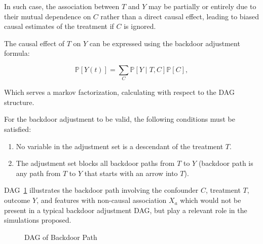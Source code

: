 \documentclass{article}
\numberwithin{equation}{section}
\begin{document}
In such case, the association between $T$ and $Y$ may be partially or entirely due to their mutual dependence on $C$ rather than a direct causal effect, leading to biased causal estimates of the treatment if $C$ is ignored.

The causal effect of $T$ on $Y$ can be expressed using the backdoor adjustment formula:

\begin{equation}
    \mathbb{P}[Y(t)] = \sum_C \mathbb{P}[Y \mid T, C] \mathbb{P}[C],
\end{equation}

Which serves a markov factorization, calculating with respect to the DAG structure.

For the backdoor adjustment to be valid, the following conditions must be satisfied:

\begin{enumerate}
    \item No variable in the adjustment set is a descendant of the treatment $T$.
    \item The adjustment set blocks all backdoor paths from $T$ to $Y$ (backdoor path is any path from $T$ to $Y$ that starts with an arrow into $T$).
\end{enumerate}

DAG~\ref{fig:dag_backdoor_path} illustrates the backdoor path involving the confounder $C$, treatment $T$, outcome $Y$, and features with non-causal association $X_a$ which would not be present in a typical backdoor adjustment DAG, but play a relevant role in the simulations proposed.

\begin{figure}[H]
    \centering
    \caption{DAG of Backdoor Path}
    \label{fig:dag_backdoor_path}
\end{figure}
\end{document}
